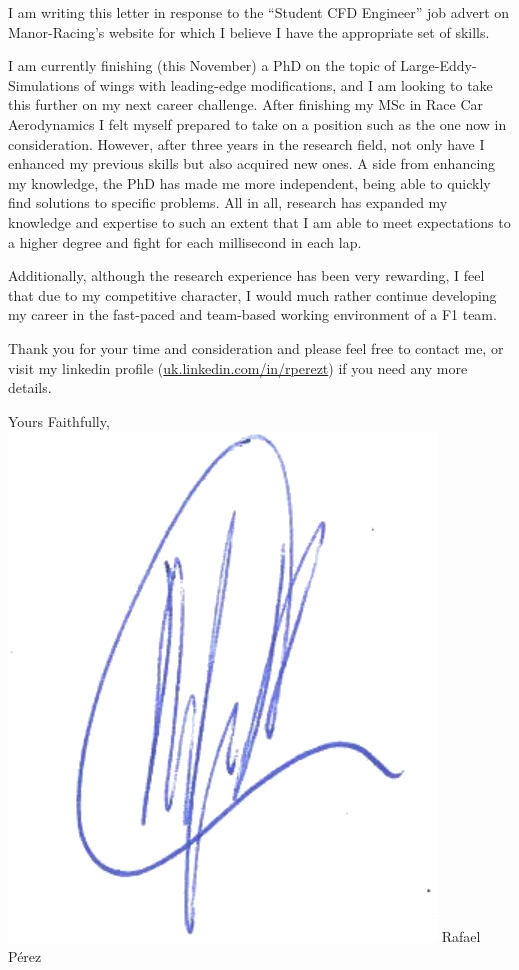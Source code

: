\documentclass[10pt,stdletter,dateno,sigleft]{newlfm} %
\begin{document}
\begin{newlfm}


I am writing this letter in response to the ``Student CFD Engineer'' job advert on
Manor-Racing's website for which I believe I have the appropriate set of skills. 

I am currently finishing (this November) a PhD on the topic of Large-Eddy-Simulations of
wings with leading-edge modifications, and I am looking to take this further on my next
career challenge. After finishing my MSc in Race Car Aerodynamics I felt myself prepared to take
on a position such as the one now in consideration. However, after three years in the
research field, not only have I enhanced my previous skills but also acquired new
ones. A side from enhancing my knowledge, the PhD has made me more independent, being able
to quickly find solutions to specific problems. All in all, research has expanded my
knowledge and expertise to such an extent that I am able to meet expectations to a higher
degree and fight for each millisecond in each lap.

Additionally, although the research experience has been very rewarding, I feel that due to
my competitive character, I would much rather continue developing my career in the
fast-paced and team-based working environment of a F1 team.

Thank you for your time and consideration and please feel free to contact me, or visit my
linkedin profile (\href{https://uk.linkedin.com/in/rperezt}{uk.linkedin.com/in/rperezt})
if you need any more details.

Yours Faithfully, \newline %
\includegraphics[scale=0.6]{sgtrBlue} \newline 
Rafael P\'erez


\end{newlfm}
\end{document}
